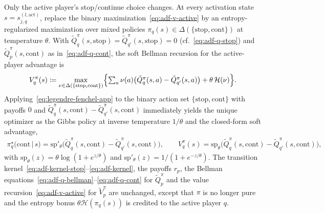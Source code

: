 \documentclass[twoside]{article}
\newcommand{\1}{\mathbf{1}}
\begin{document}
Only the active player's stop/continue choice changes. At every activation state $s = s_{j,q}^{(l,
    \mathrm{act})}$, replace the binary maximization~\eqref{eq:adf-v-active} by an entropy-regularized
maximization over mixed policies $\pi_q(s) \in \Delta(\{\mathrm{stop},\mathrm{cont}\})$ at
temperature $\theta$. With $\tilde Q_q^\pi(s, \mathrm{stop}) = \tilde Q_{q'}^\pi(s, \mathrm{stop})
    = 0$ (cf.~\eqref{eq:adf-q-stop}) and $\tilde Q_p^\pi(s, \mathrm{cont})$ as
in~\eqref{eq:adf-q-cont}, the soft Bellman recursion for the active-player advantage is
\begin{align}\label{eq:softplus-soft-bellman}
    V_q^\pi(s)
    \coloneqq
    \max_{\nu \in \Delta(\{\mathrm{stop},\mathrm{cont}\})} \Bigl\{
    \textstyle\sum_{a} \nu(a)\bigl(\tilde Q_q^\pi(s, a) - \tilde Q_{q'}^\pi(s, a)\bigr)
    + \theta\, \mathcal{H}(\nu)
    \Bigr\}.
\end{align}
Applying~\eqref{eq:legendre-fenchel-app} to the binary action set $\{\mathrm{stop},\mathrm{cont}\}$
with payoffs $0$ and $\tilde Q_q^\pi(s, \mathrm{cont}) - \tilde Q_{q'}^\pi(s, \mathrm{cont})$
immediately yields the unique optimizer as the Gibbs policy at inverse temperature $1/\theta$ and
the closed-form soft advantage,
\begin{align}\label{eq:softplus-policy}
    \pi_q^\star\!\bigl(\mathrm{cont} \,\big|\, s\bigr)
    = \mathrm{sp}'_\theta\bigl(\tilde Q_q^\pi(s, \mathrm{cont}) - \tilde Q_{q'}^\pi(s,
    \mathrm{cont})\bigr),
    \qquad
    V_q^\pi(s)
    = \mathrm{sp}_\theta\bigl(\tilde Q_q^\pi(s, \mathrm{cont}) - \tilde Q_{q'}^\pi(s,
    \mathrm{cont})\bigr),
\end{align}
with $\mathrm{sp}_\theta(z) = \theta\log(1+e^{z/\theta})$ and $\mathrm{sp}'_\theta(z) =
    1/(1+e^{-z/\theta})$. The transition kernel~\eqref{eq:adf-kernel-stop}--\eqref{eq:adf-kernel}, the
payoffs $r_p$, the Bellman equations~\eqref{eq:adf-q-bellman}--\eqref{eq:adf-q-cont} for $\tilde
    Q_p^\pi$ and the value recursion~\eqref{eq:adf-v-active} for $\tilde V_p^\pi$ are unchanged, except
that $\pi$ is no longer pure and the entropy bonus $\theta\mathcal{H}(\pi_q(s))$ is credited to the
active player $q$.
\end{document}
